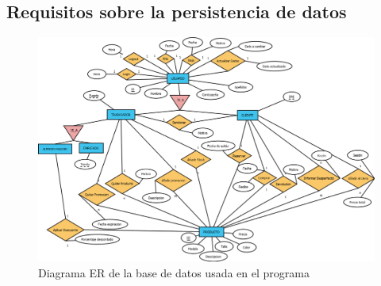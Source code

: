 \subsection{Requisitos sobre la persistencia de datos}
\label{sec:req_pers_dat}
\begin{figure}[H]
    \centering
    \includegraphics[width=\textwidth]{images/DiagramaER.png}
    \caption{Diagrama ER de la base de datos usada en el programa}
\end{figure}
